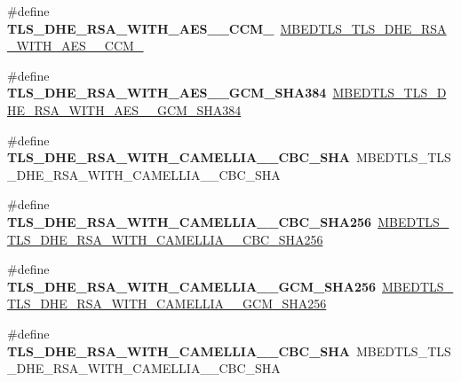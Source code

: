\begin{DoxyCompactItemize}
\#define {\bfseries T\+L\+S\+\_\+\+D\+H\+E\+\_\+\+R\+S\+A\+\_\+\+W\+I\+T\+H\+\_\+\+A\+E\+S\+\_\+\_\+\+C\+C\+M\+\_}~\mbox{\hyperlink{ssl__ciphersuites_8h_a34c988c8893002c5413fd0286b5a8db2}{M\+B\+E\+D\+T\+L\+S\+\_\+\+T\+L\+S\+\_\+\+D\+H\+E\+\_\+\+R\+S\+A\+\_\+\+W\+I\+T\+H\+\_\+\+A\+E\+S\+\_\+\_\+\+C\+C\+M\+\_}}
\item 
\mbox{\label{compat-1_83_8h_a35101dd242f84d4c2d1d9d7b0d866a7b}} 
\#define {\bfseries T\+L\+S\+\_\+\+D\+H\+E\+\_\+\+R\+S\+A\+\_\+\+W\+I\+T\+H\+\_\+\+A\+E\+S\+\_\+\_\+\+G\+C\+M\+\_\+\+S\+H\+A384}~\mbox{\hyperlink{ssl__ciphersuites_8h_a24defd8d527f411e6c3ca15edc9f7dfb}{M\+B\+E\+D\+T\+L\+S\+\_\+\+T\+L\+S\+\_\+\+D\+H\+E\+\_\+\+R\+S\+A\+\_\+\+W\+I\+T\+H\+\_\+\+A\+E\+S\+\_\+\_\+\+G\+C\+M\+\_\+\+S\+H\+A384}}
\item 
\mbox{\label{compat-1_83_8h_ab63532e90285928744ee177da2a5ab41}} 
\#define {\bfseries T\+L\+S\+\_\+\+D\+H\+E\+\_\+\+R\+S\+A\+\_\+\+W\+I\+T\+H\+\_\+\+C\+A\+M\+E\+L\+L\+I\+A\+\_\+\_\+\+C\+B\+C\+\_\+\+S\+HA}~M\+B\+E\+D\+T\+L\+S\+\_\+\+T\+L\+S\+\_\+\+D\+H\+E\+\_\+\+R\+S\+A\+\_\+\+W\+I\+T\+H\+\_\+\+C\+A\+M\+E\+L\+L\+I\+A\+\_\+\_\+\+C\+B\+C\+\_\+\+S\+HA
\item 
\mbox{\label{compat-1_83_8h_a54e0e07b7560eded37f6fddf43bce334}} 
\#define {\bfseries T\+L\+S\+\_\+\+D\+H\+E\+\_\+\+R\+S\+A\+\_\+\+W\+I\+T\+H\+\_\+\+C\+A\+M\+E\+L\+L\+I\+A\+\_\+\_\+\+C\+B\+C\+\_\+\+S\+H\+A256}~\mbox{\hyperlink{ssl__ciphersuites_8h_a75058a24900ecaa3411bf19379b32914}{M\+B\+E\+D\+T\+L\+S\+\_\+\+T\+L\+S\+\_\+\+D\+H\+E\+\_\+\+R\+S\+A\+\_\+\+W\+I\+T\+H\+\_\+\+C\+A\+M\+E\+L\+L\+I\+A\+\_\+\_\+\+C\+B\+C\+\_\+\+S\+H\+A256}}
\item 
\mbox{\label{compat-1_83_8h_ace165cdb18f9640a9d7dcd9585d962e2}} 
\#define {\bfseries T\+L\+S\+\_\+\+D\+H\+E\+\_\+\+R\+S\+A\+\_\+\+W\+I\+T\+H\+\_\+\+C\+A\+M\+E\+L\+L\+I\+A\+\_\+\_\+\+G\+C\+M\+\_\+\+S\+H\+A256}~\mbox{\hyperlink{ssl__ciphersuites_8h_a521dfdf48c7a3abf9f9cd5d043df2de1}{M\+B\+E\+D\+T\+L\+S\+\_\+\+T\+L\+S\+\_\+\+D\+H\+E\+\_\+\+R\+S\+A\+\_\+\+W\+I\+T\+H\+\_\+\+C\+A\+M\+E\+L\+L\+I\+A\+\_\+\_\+\+G\+C\+M\+\_\+\+S\+H\+A256}}
\item 
\mbox{\label{compat-1_83_8h_a62aa85a37da68dc2578ce8a3e0b9043b}} 
\#define {\bfseries T\+L\+S\+\_\+\+D\+H\+E\+\_\+\+R\+S\+A\+\_\+\+W\+I\+T\+H\+\_\+\+C\+A\+M\+E\+L\+L\+I\+A\+\_\+\_\+\+C\+B\+C\+\_\+\+S\+HA}~M\+B\+E\+D\+T\+L\+S\+\_\+\+T\+L\+S\+\_\+\+D\+H\+E\+\_\+\+R\+S\+A\+\_\+\+W\+I\+T\+H\+\_\+\+C\+A\+M\+E\+L\+L\+I\+A\+\_\+\_\+\+C\+B\+C\+\_\+\+S\+HA

\end{DoxyCompactItemize}
